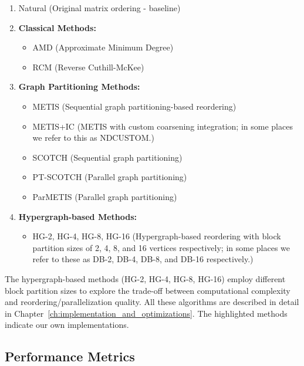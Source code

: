 \begin{enumerate}

   \item Natural (Original matrix ordering - baseline)
   
   \item \textbf{Classical Methods:}
   \begin{itemize}[noitemsep,topsep=0pt]
      \item AMD (Approximate Minimum Degree)
      \item RCM (Reverse Cuthill-McKee)
   \end{itemize}
   
   \item \textbf{Graph Partitioning Methods:}
   \begin{itemize}[noitemsep,topsep=0pt]
      \item METIS (Sequential graph partitioning-based reordering)
      \item \colorbox{yellow!60}{METIS+IC} (METIS with custom coarsening integration; in some places we refer to this as NDCUSTOM.)
      \item SCOTCH (Sequential graph partitioning)
      \item PT-SCOTCH (Parallel graph partitioning)
      \item ParMETIS (Parallel graph partitioning)
   \end{itemize}
   
   \item \textbf{Hypergraph-based Methods:}
   \begin{itemize}[noitemsep,topsep=0pt]
      \item \colorbox{yellow!60}{HG-2}, \colorbox{yellow!60}{HG-4}, \colorbox{yellow!60}{HG-8}, \colorbox{yellow!60}{HG-16} (Hypergraph-based reordering with block partition sizes of 2, 4, 8, and 16 vertices respectively; in some places we refer to these as DB-2, DB-4, DB-8, and DB-16 respectively.) 
   \end{itemize}

\end{enumerate}

The hypergraph-based methods (HG-2, HG-4, HG-8, HG-16) employ different block partition sizes to explore the trade-off between computational complexity and reordering/parallelization quality. All these algorithms are described in detail in Chapter~\ref{ch:implementation_and_optimizations}. The \colorbox{yellow!60}{highlighted methods} indicate our own implementations. 

\subsection{Performance Metrics}

